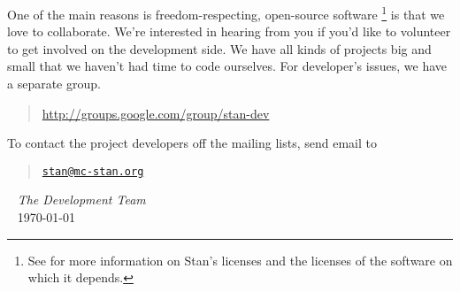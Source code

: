 One of the main reasons \Stan is freedom-respecting, open-source
software%
%
\footnote{See  for more information on Stan's
  licenses and the licenses of the software on which it depends.}
%
is that we love to collaborate.  We're interested in hearing
from you if you'd like to volunteer to get involved on the development
side.  We have all kinds of projects big and small that we haven't had
time to code ourselves.  For developer's issues, we have a separate
group.
%
\begin{quote}
\url{http://groups.google.com/group/stan-dev}
\end{quote}

To contact the project developers off the mailing lists, send email to
\begin{quote}
\href{mailto:stan@mc-stan.org}{\nolinkurl{stan@mc-stan.org}}
\end{quote}

\vspace*{12pt}
\mbox{ } \hfill {\it The \Stan Development Team}
\\
\mbox{ } \hfill \today
